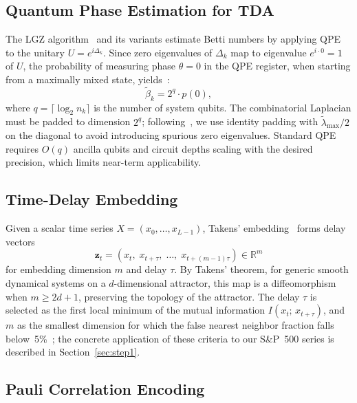 \documentclass[conference,10pt]{IEEEtran}
\begin{document}
\subsection{Quantum Phase Estimation for TDA}\label{sec:qpe_background}

The LGZ algorithm~\cite{lloyd2016quantum} and its variants estimate
Betti numbers by applying QPE to the unitary $U = e^{i\Delta_k}$. Since
zero eigenvalues of $\Delta_k$ map to eigenvalue $e^{i \cdot 0} = 1$ of
$U$, the probability of measuring phase $\theta = 0$ in the QPE
register, when starting from a maximally mixed state,
yields~\cite{Khandelwal23}:
\begin{equation}
    \tilde{\beta}_k = 2^q \cdot p(0),
    \label{eq:betti_est}
\end{equation}
where $q = \lceil \log_2 n_k \rceil$ is the number of system qubits.
The combinatorial Laplacian must be padded to dimension $2^q$;
following~\cite{Khandelwal23}, we use identity padding with
$\tilde{\lambda}_{\max}/2$ on the diagonal to avoid introducing
spurious zero eigenvalues. Standard QPE requires $O(q)$ ancilla qubits
and circuit depths scaling with the desired precision, which limits
near-term applicability.

\subsection{Time-Delay Embedding}\label{sec:takens}

Given a scalar time series $X = (x_0, \ldots, x_{L-1})$, Takens'
embedding~\cite{Tak81} forms delay vectors
\begin{equation}
    \mathbf{z}_t = (x_t,\; x_{t+\tau},\; \ldots,\;
                    x_{t+(m-1)\tau}) \in \mathbb{R}^m
    \label{eq:takens}
\end{equation}
for embedding dimension $m$ and delay $\tau$. By Takens' theorem, for
generic smooth dynamical systems on a $d$-dimensional attractor, this
map is a diffeomorphism when $m \geq 2d+1$, preserving the topology of
the attractor. The delay $\tau$ is selected as the first local minimum
of the mutual information $I(x_t;\,x_{t+\tau})$, and $m$ as the
smallest dimension for which the false nearest neighbor fraction falls
below~5\%~\cite{KS04}; the concrete application of these criteria to
our S\&P~500 series is described in Section~\ref{sec:step1}.

\subsection{Pauli Correlation Encoding}\label{sec:pce_background}
\end{document}

